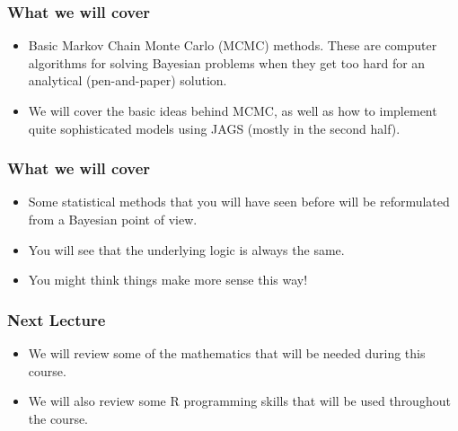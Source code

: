 \documentclass{beamer}
\begin{document}
\begin{frame}
\frametitle{What we will cover}
\begin{itemize}
\item Basic Markov Chain Monte Carlo (MCMC) methods. These are computer algorithms for solving Bayesian problems when they get too hard for an analytical (pen-and-paper) solution.\pause \\[0.5em]

\item We will cover the basic ideas behind MCMC, as well as how to implement quite sophisticated models using JAGS (mostly in the second half).
\end{itemize}
\end{frame}


\begin{frame}
\frametitle{What we will cover}
\begin{itemize}
\item Some statistical methods that you will have seen before will be reformulated from a Bayesian point of view.\pause \\[0.5em]

\item You will see that the underlying logic is always the same. \pause \\[0.5em]

\item You might think things make more sense this way!
\end{itemize}
\end{frame}

\begin{frame}
\frametitle{Next Lecture}
\begin{itemize}
\item  We will review some of the mathematics that will be needed during this course.\pause \\[0.5em]

\item We will also review some R programming skills that will be used throughout the course.
\end{itemize}
\end{frame}
\end{document}
